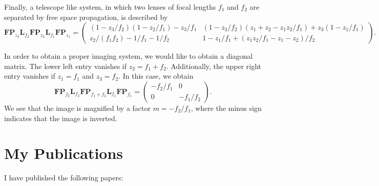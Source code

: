 \documentclass[a4paper,10pt]{report}
\begin{document}
Finally, a telescope like system, in which two lenses of focal lengths $f_1$ and $f_2$ are separated by free space propagation, is described by
\begin{equation}
    \mathbf{FP}_{z_3} \mathbf{L}_{f_2} \mathbf{FP}_{z_2} \mathbf{L}_{f_1} \mathbf{FP}_{z_1} = \begin{pmatrix}
        (1-z_3/f_2)(1-z_2/f_1) - z_3 / f_1 & (1 - z_3 / f_2)(z_1 + z_2 - z_1 z_2 / f_1) + z_3 (1 - z_1 / f_1) \\
        z_2 / (f_1 f_2) - 1/f_1 - 1/f_2 & 1 - z_1 / f_1 + (z_1 z_2 / f_1 - z_1 - z_2)/f_2
    \end{pmatrix} .
\end{equation}

In order to obtain a proper imaging system, we would like to obtain a diagonal matrix. The lower left entry vanishes if $z_2 = f_1 + f_2$. Additionally, the upper right entry vanishes if $z_1 = f_1$ and $z_3 = f_2$. In this case, we obtain 
\begin{equation}
    \mathbf{FP}_{f_2} \mathbf{L}_{f_2} \mathbf{FP}_{f_1+f_2} \mathbf{L}_{f_1} \mathbf{FP}_{f_1} = \begin{pmatrix}
        -f_2 / f_1 & 0 \\
        0 & -f_1 / f_2
    \end{pmatrix} .
\end{equation}
We see that the image is magnified by a factor $m = -f_2 / f_1$, where the minus sign indicates that the image is inverted.

\chapter{My Publications}

I have published the following papers: \cite{PhysRevA.108.013503, DEOLIVEIRA2024110983, 48bj-bm8b}



\end{document}
